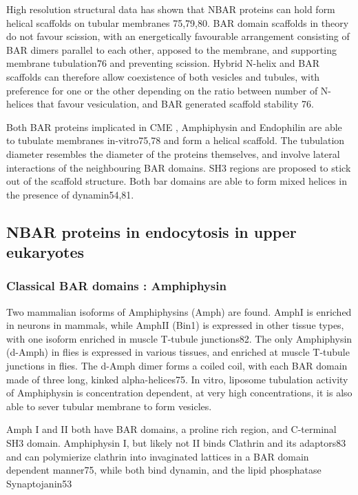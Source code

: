 	\vspace{5mm}
	High resolution structural data has shown that NBAR proteins can hold form helical scaffolds on tubular membranes 75,79,80. BAR domain scaffolds in theory do not favour scission, with an energetically favourable arrangement consisting of BAR dimers parallel to each other, apposed to the membrane, and supporting membrane tubulation76 and preventing scission. Hybrid N-helix and BAR scaffolds can therefore allow coexistence of both vesicles and tubules, with preference for one or the other depending on the ratio between number of N-helices that favour vesiculation, and BAR generated scaffold stability 76. 

	\vspace{5mm}
	Both BAR proteins implicated in CME , Amphiphysin and Endophilin are able to tubulate membranes in-vitro75,78 and form a helical scaffold. The tubulation diameter resembles the diameter of the proteins themselves, and involve lateral interactions of the neighbouring BAR domains. SH3 regions are proposed to stick out of the scaffold structure. Both bar domains are able to form mixed helices in the presence of dynamin54,81. 

	\subsection{NBAR proteins in endocytosis in upper eukaryotes}		
		\subsubsection{Classical BAR domains : Amphiphysin}
		Two mammalian isoforms of Amphiphysins (Amph) are found. AmphI is enriched in neurons in mammals, while AmphII (Bin1) is expressed in other tissue types, with one isoform enriched in muscle T-tubule junctions82. The only Amphiphysin (d-Amph) in flies is expressed in various tissues, and enriched at muscle T-tubule junctions in flies. The d-Amph dimer forms a coiled coil, with each BAR domain made of three long, kinked alpha-helices75. In vitro, liposome tubulation activity of Amphiphysin is concentration dependent, at very high concentrations, it is also able to sever tubular membrane to form vesicles. 

		\vspace{5mm}
		Amph I and II both have BAR domains, a proline rich region, and C-terminal SH3 domain. Amphiphysin I, but likely not II binds Clathrin and its adaptors83 and can polymierize clathrin into invaginated lattices in a BAR domain dependent manner75, while both bind dynamin, and the lipid phosphatase Synaptojanin53


